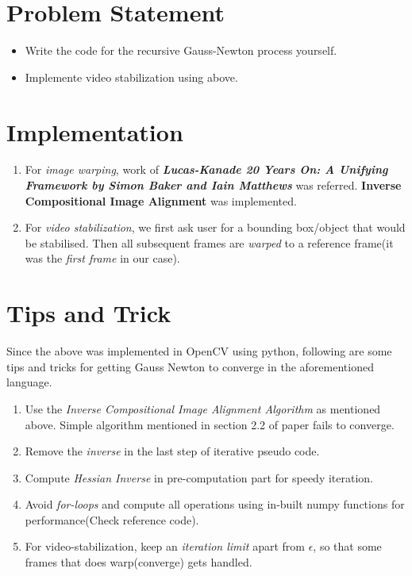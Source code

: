 \documentclass[12pt]{article}
\author{
  Gupta, Ankesh\\
  \texttt{2015CS10435}
}
\begin{document}
\maketitle

\section{Problem Statement}
\begin{itemize}
    \item Write the code for the recursive Gauss-Newton process yourself.
    \item Implemente video stabilization using above.
\end{itemize}


\section{Implementation}
\begin{enumerate}
    \item For \emph{image warping}, work of \textbf{\emph{Lucas-Kanade 20 Years On: A Unifying Framework by Simon Baker and Iain Matthews}} was referred. \textbf{Inverse Compositional Image Alignment} was implemented. 
    \item For \emph{video stabilization}, we first ask user for a bounding box/object that would be stabilised. Then all subsequent frames are \emph{warped} to a reference frame(it was the \emph{first frame} in our case).
\end{enumerate}

\section{Tips and Trick}
Since the above was implemented in OpenCV using python, following are some tips and tricks for getting Gauss Newton to converge in the aforementioned language.
\begin{enumerate}
    \item Use the \emph{Inverse Compositional Image Alignment Algorithm} as mentioned above. Simple algorithm mentioned in section 2.2 of paper fails to converge.
    \item Remove the \emph{inverse} in the last step of iterative pseudo code.
    \item Compute \emph{Hessian Inverse} in pre-computation part for speedy iteration.
    \item Avoid \emph{for-loops} and compute all operations using in-built numpy functions for performance(Check reference code).
    \item For video-stabilization, keep an \emph{iteration limit} apart from $\epsilon$, so that some frames that does warp(converge) gets handled.
\end{enumerate}
\end{document}
